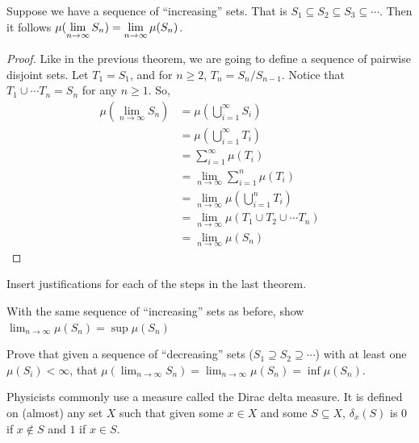 \begin{theorem}
    Suppose we have a sequence of ``increasing'' sets. That is $S_1\subseteq S_2\subseteq S_3\subseteq \cdots$. Then it follows $\displaystyle \mu(\lim_{n\to\infty}S_n)=\lim_{n\to\infty} \mu(S_n)$. \par
    \begin{proof}
        Like in the previous theorem, we are going to define a sequence of pairwise disjoint sets. Let $T_1=S_1$, and for $n\geq 2$, $T_n=S_n/S_{n-1}$. Notice that \break $T_1\cup\cdots T_n=S_n$ for any $n\geq 1$. So, 
        \begin{align*}
            \mu\left(\lim_{n\to\infty}S_n\right) &= \mu\left(\bigcup_{i=1}^\infty S_i\right)\\
            &= \mu\left(\bigcup_{i=1}^\infty T_i\right) \\
            &= \sum_{i=1}^\infty \mu(T_i) \\
            &= \lim_{n\to\infty} \sum_{i=1}^n \mu(T_i) \\
            &= \lim_{n\to\infty} \mu\left(\bigcup_{i=1}^n T_i \right) \\
            &= \lim_{n\to\infty} \mu(T_1\cup T_2 \cup \cdots T_n) \\
            &= \lim_{n\to\infty} \mu(S_n)
        \end{align*}
    \end{proof}
\end{theorem}

\begin{exercise}
    Insert justifications for each of the steps in the last theorem.
\end{exercise}

\begin{exercise}
    With the same sequence of ``increasing'' sets as before, show $\lim_{n\to\infty} \mu(S_n) = \sup \mu(S_n)$
\end{exercise}

\clearpage

    
\begin{exercise}
    Prove that given a sequence of ``decreasing'' sets ($S_1\supseteq S_2 \supseteq \cdots$) with at least one $\mu(S_i)<\infty$, that $\mu\left(\lim_{n\to\infty} S_n\right) = \lim_{n\to\infty}\mu\left( S_n\right) = \inf \mu(S_n)$. 
\end{exercise}



Physicists commonly use a measure called the Dirac delta measure. It is defined on (almost) any set $X$ such that given some $x\in X$ and some $S\subseteq X$, $\delta _x(S)$ is $0$ if $x\notin S$ and $1$ if $x\in S$. 

